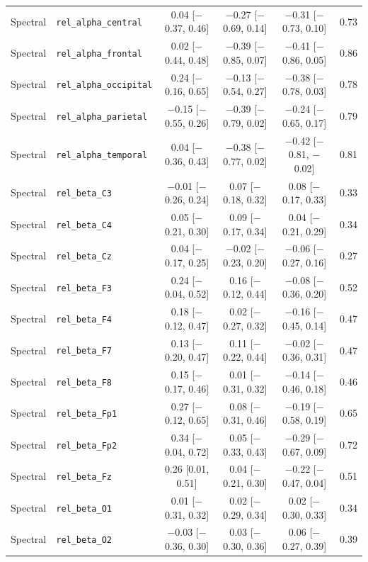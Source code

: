 {\begin{longtable}{llcccc}
Spectral & \texttt{rel\_alpha\_central} & 0.04 [$-$0.37, 0.46] & $-$0.27 [$-$0.69, 0.14] & $-$0.31 [$-$0.73, 0.10] & 0.73 \\
Spectral & \texttt{rel\_alpha\_frontal} & 0.02 [$-$0.44, 0.48] & $-$0.39 [$-$0.85, 0.07] & $-$0.41 [$-$0.86, 0.05] & 0.86 \\
Spectral & \texttt{rel\_alpha\_occipital} & 0.24 [$-$0.16, 0.65] & $-$0.13 [$-$0.54, 0.27] & $-$0.38 [$-$0.78, 0.03] & 0.78 \\
Spectral & \texttt{rel\_alpha\_parietal} & $-$0.15 [$-$0.55, 0.26] & $-$0.39 [$-$0.79, 0.02] & $-$0.24 [$-$0.65, 0.17] & 0.79 \\
Spectral & \texttt{rel\_alpha\_temporal} & 0.04 [$-$0.36, 0.43] & $-$0.38 [$-$0.77, 0.02] & $-$0.42 [$-$0.81, $-$0.02] & 0.81 \\
Spectral & \texttt{rel\_beta\_C3} & $-$0.01 [$-$0.26, 0.24] & 0.07 [$-$0.18, 0.32] & 0.08 [$-$0.17, 0.33] & 0.33 \\
Spectral & \texttt{rel\_beta\_C4} & 0.05 [$-$0.21, 0.30] & 0.09 [$-$0.17, 0.34] & 0.04 [$-$0.21, 0.29] & 0.34 \\
Spectral & \texttt{rel\_beta\_Cz} & 0.04 [$-$0.17, 0.25] & $-$0.02 [$-$0.23, 0.20] & $-$0.06 [$-$0.27, 0.16] & 0.27 \\
Spectral & \texttt{rel\_beta\_F3} & 0.24 [$-$0.04, 0.52] & 0.16 [$-$0.12, 0.44] & $-$0.08 [$-$0.36, 0.20] & 0.52 \\
Spectral & \texttt{rel\_beta\_F4} & 0.18 [$-$0.12, 0.47] & 0.02 [$-$0.27, 0.32] & $-$0.16 [$-$0.45, 0.14] & 0.47 \\
Spectral & \texttt{rel\_beta\_F7} & 0.13 [$-$0.20, 0.47] & 0.11 [$-$0.22, 0.44] & $-$0.02 [$-$0.36, 0.31] & 0.47 \\
Spectral & \texttt{rel\_beta\_F8} & 0.15 [$-$0.17, 0.46] & 0.01 [$-$0.31, 0.32] & $-$0.14 [$-$0.46, 0.18] & 0.46 \\
Spectral & \texttt{rel\_beta\_Fp1} & 0.27 [$-$0.12, 0.65] & 0.08 [$-$0.31, 0.46] & $-$0.19 [$-$0.58, 0.19] & 0.65 \\
Spectral & \texttt{rel\_beta\_Fp2} & 0.34 [$-$0.04, 0.72] & 0.05 [$-$0.33, 0.43] & $-$0.29 [$-$0.67, 0.09] & 0.72 \\
Spectral & \texttt{rel\_beta\_Fz} & 0.26 [0.01, 0.51] & 0.04 [$-$0.21, 0.30] & $-$0.22 [$-$0.47, 0.04] & 0.51 \\
Spectral & \texttt{rel\_beta\_O1} & 0.01 [$-$0.31, 0.32] & 0.02 [$-$0.29, 0.34] & 0.02 [$-$0.30, 0.33] & 0.34 \\
Spectral & \texttt{rel\_beta\_O2} & $-$0.03 [$-$0.36, 0.30] & 0.03 [$-$0.30, 0.36] & 0.06 [$-$0.27, 0.39] & 0.39 \\

\end{longtable}}
